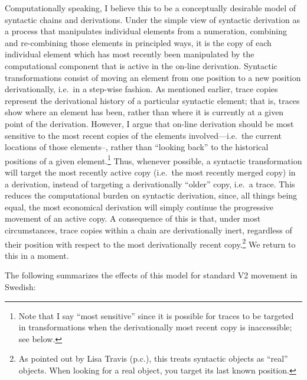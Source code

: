 Computationally speaking, I believe this to be a conceptually desirable model of syntactic chains and derivations. Under the simple view of syntactic derivation as a process that manipulates individual elements from a numeration, combining and re-combining those elements in principled ways, it is the copy of each individual element which has most recently been manipulated by the computational component that is active in the on-line derivation. Syntactic transformations consist of moving an element from one position to a new position derivationally, i.e.\ in a step-wise fashion. As mentioned earlier, trace copies represent the derivational history of a particular syntactic element; that is, traces show where an element has been, rather than where it is currently at a given point of the derivation. However, I argue that on-line derivation should be most sensitive to the most recent copies of the elements involved---i.e.\ the current locations of those elements--, rather than ``looking back'' to the historical positions of a given element.\footnote{Note that I say ``most sensitive'' since it is possible for traces to be targeted in transformations when the derivationally most recent copy is inaccessible; see below.} Thus, whenever possible, a syntactic transformation will target the most recently active copy (i.e.\ the most recently merged copy) in a derivation, instead of targeting a derivationally ``older'' copy, i.e.\ a trace. This reduces the computational burden on syntactic derivation, since, all things being equal, the most economical derivation will simply continue the progressive movement of an active copy. A consequence of this is that, under most circumstances, trace copies within a chain are derivationally inert, regardless of their position with respect to the most derivationally recent copy.\footnote{As pointed out by Lisa Travis (p.c.), this treats syntactic objects as ``real'' objects. When looking for a real object, you target its last known position.} We return to this in a moment.

The following summarizes the effects of this model for standard V2 movement in Swedish:

